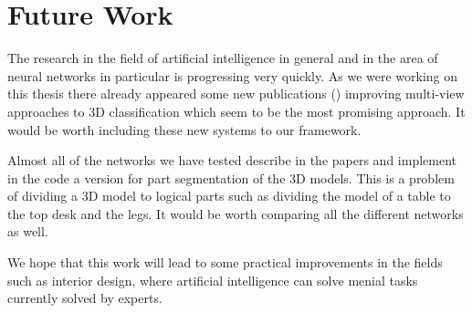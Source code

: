 \section{Future Work}
The research in the field of artificial intelligence in general and in the area of neural networks in particular is progressing very quickly. As we were working on this thesis there already appeared some new publications (\cite{yu_multi-view_2018, you_pvnet:_2018, feng_gvcnn:_2018}) improving multi-view approaches to 3D classification which seem to be the most promising approach. It would be worth including these new systems to our framework. \par
Almost all of the networks we have tested describe in the papers and implement in the code a version for part segmentation of the 3D models. This is a problem of dividing a 3D model to logical parts such as dividing the model of a table to the top desk and the legs. It would be worth comparing all the different networks as well.\par
We hope that this work will lead to some practical improvements in the fields such as interior design, where artificial intelligence can solve menial tasks currently solved by experts. 
